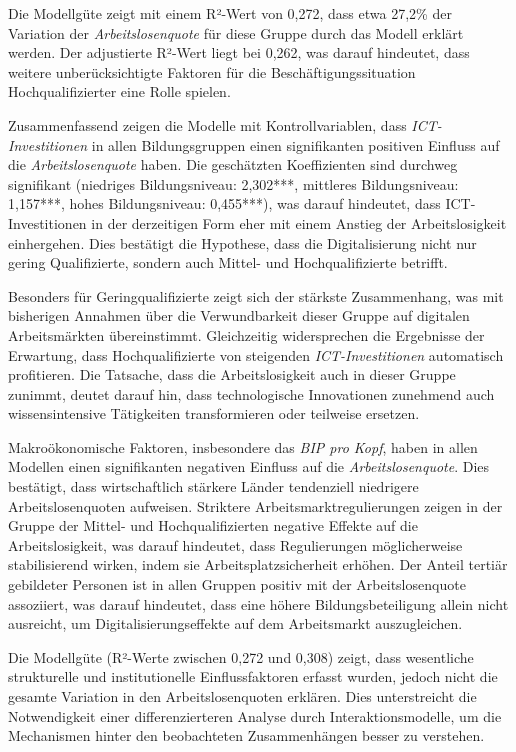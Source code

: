Die Modellgüte zeigt mit einem R²-Wert von 0,272, dass etwa 27,2\% der Variation der 
\textit{Arbeitslosenquote} für diese Gruppe durch das Modell erklärt werden. Der adjustierte 
R²-Wert liegt bei 0,262, was darauf hindeutet, dass weitere unberücksichtigte Faktoren für 
die Beschäftigungssituation Hochqualifizierter eine Rolle spielen.

Zusammenfassend zeigen die Modelle mit Kontrollvariablen, dass 
\textit{\ac{ICT}-Investitionen} in allen Bildungsgruppen einen signifikanten positiven 
Einfluss auf die \textit{Arbeitslosenquote} haben. Die geschätzten Koeffizienten sind 
durchweg signifikant (niedriges Bildungsniveau: 2,302***, mittleres Bildungsniveau: 
1,157***, hohes Bildungsniveau: 0,455***), was darauf hindeutet, dass 
\ac{ICT}-Investitionen in der derzeitigen Form eher mit einem Anstieg der Arbeitslosigkeit 
einhergehen. Dies bestätigt die Hypothese, dass die Digitalisierung nicht nur gering 
Qualifizierte, sondern auch Mittel- und Hochqualifizierte betrifft.

Besonders für Geringqualifizierte zeigt sich der stärkste Zusammenhang, was mit bisherigen 
Annahmen über die Verwundbarkeit dieser Gruppe auf digitalen Arbeitsmärkten übereinstimmt. 
Gleichzeitig widersprechen die Ergebnisse der Erwartung, dass Hochqualifizierte von 
steigenden \textit{\ac{ICT}-Investitionen} automatisch profitieren. Die Tatsache, dass die 
Arbeitslosigkeit auch in dieser Gruppe zunimmt, deutet darauf hin, dass technologische 
Innovationen zunehmend auch wissensintensive Tätigkeiten transformieren oder teilweise 
ersetzen.

Makroökonomische Faktoren, insbesondere das \textit{\ac{BIP} pro Kopf}, haben in allen 
Modellen einen signifikanten negativen Einfluss auf die \textit{Arbeitslosenquote}. Dies 
bestätigt, dass wirtschaftlich stärkere Länder tendenziell niedrigere Arbeitslosenquoten 
aufweisen. Striktere Arbeitsmarktregulierungen zeigen in der Gruppe der Mittel- und 
Hochqualifizierten negative Effekte auf die Arbeitslosigkeit, was darauf hindeutet, dass 
Regulierungen möglicherweise stabilisierend wirken, indem sie Arbeitsplatzsicherheit 
erhöhen. Der Anteil tertiär gebildeter Personen ist in allen Gruppen positiv mit der 
Arbeitslosenquote assoziiert, was darauf hindeutet, dass eine höhere Bildungsbeteiligung 
allein nicht ausreicht, um Digitalisierungseffekte auf dem Arbeitsmarkt auszugleichen.

Die Modellgüte (R²-Werte zwischen 0,272 und 0,308) zeigt, dass wesentliche strukturelle 
und institutionelle Einflussfaktoren erfasst wurden, jedoch nicht die gesamte Variation in 
den Arbeitslosenquoten erklären. Dies unterstreicht die Notwendigkeit einer 
differenzierteren Analyse durch Interaktionsmodelle, um die Mechanismen hinter den 
beobachteten Zusammenhängen besser zu verstehen.

